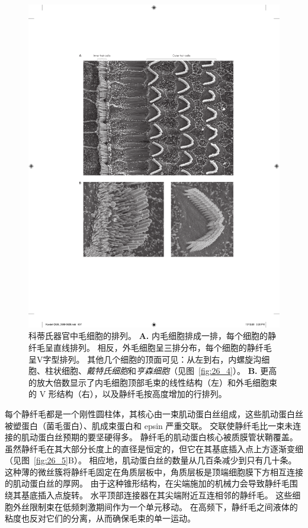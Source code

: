 \begin{figure}[htbp]
	\centering
	\includegraphics[width=0.8\linewidth]{chap26/fig_26_6}
	\caption{科蒂氏器官中毛细胞的排列。
		\textbf{A.} 内毛细胞排成一排，每个细胞的静纤毛呈直线排列。 
		相反，外毛细胞呈三排分布，每个细胞的静纤毛呈V字型排列。 
		其他几个细胞的顶面可见：从左到右，内螺旋沟细胞、柱状细胞、\textit{戴特氏细胞}和\textit{亨森细胞}（见图~\ref{fig:26_4}）。
		\textbf{B.} 更高的放大倍数显示了内毛细胞顶部毛束的线性结构（左）和外毛细胞束的 V 形结构（右），以及静纤毛按高度增加的行排列。}
	\label{fig:26_6}
\end{figure}


每个静纤毛都是一个刚性圆柱体，其核心由一束肌动蛋白丝组成，这些肌动蛋白丝被塑蛋白（菌毛蛋白）、肌成束蛋白和 epsin 严重交联。
交联使静纤毛比一束未连接的肌动蛋白丝预期的要坚硬得多。
静纤毛的肌动蛋白核心被质膜管状鞘覆盖。
虽然静纤毛在其大部分长度上的直径是恒定的，但它在其基底插入点上方逐渐变细（见图~\ref{fig:26_5}B）。
相应地，肌动蛋白丝的数量从几百条减少到只有几十条。 
这种薄的微丝簇将静纤毛固定在角质层板中，角质层板是顶端细胞膜下方相互连接的肌动蛋白丝的厚网。
由于这种锥形结构，在尖端施加的机械力会导致静纤毛围绕其基底插入点旋转。
水平顶部连接器在其尖端附近互连相邻的静纤毛。
这些细胞外丝限制束在低频刺激期间作为一个单元移动。 
在高频下，静纤毛之间液体的粘度也反对它们的分离，从而确保毛束的单一运动。


